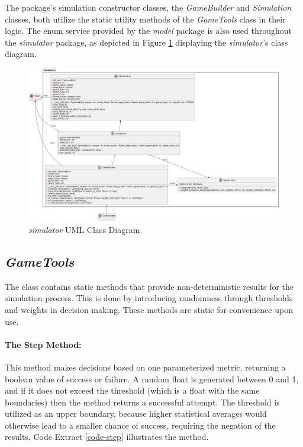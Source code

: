\documentclass{thesis-ekf}
\theoremstyle{definition}
\theoremstyle{remark}
\begin{document}
The package's simulation constructor classes, the \emph{GameBuilder} and \emph{Simulation} classes, both utilize the static utility methods of the \emph{GameTools} class in their logic. The enum service provided by the \emph{model} package is also used throughout the \emph{simulator} package, as depicted in Figure \ref{img-simulator-class} displaying the \emph{simulator}'s class diagram.

\begin{figure}[th!]
	\centering
	\includegraphics[width=1\linewidth]{img/class/simulator}
	\caption{\emph{simulator} UML Class Diagram}
	\label{img-simulator-class}
\end{figure}

\subsection{\emph{GameTools}}
The class contains static methods that provide non-deterministic results for the simulation process. This is done by introducing randomness through thresholds and weights in decision making. These methods are static for convenience upon use.

\paragraph{The Step Method:} This method makes decisions based on one parameterized metric, returning a boolean value of success or failure. A random float is generated between 0 and 1, and if it does not exceed the threshold (which is a float with the same boundaries) then the method returns a successful attempt. The threshold is utilized as an upper boundary, because higher statistical averages would otherwise lead to a smaller chance of success, requiring the negation of the results. Code Extract \ref{code-step} illustrates the method.

\end{document}
